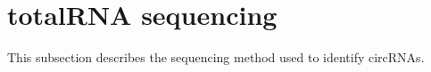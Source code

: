\section{totalRNA sequencing}
This subsection describes the sequencing method used to identify circRNAs.
\lipsum[2]